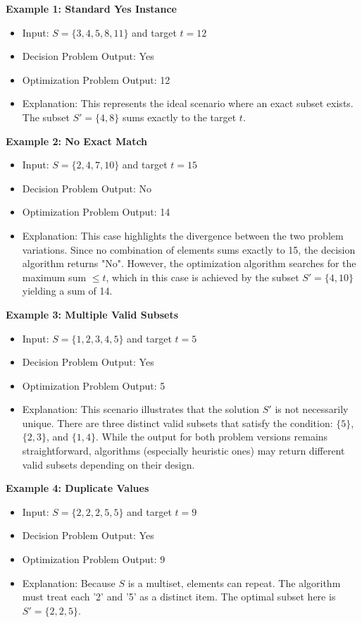 \documentclass[12pt,a4paper]{article}
\begin{document}
\textbf{Example 1: Standard Yes Instance}
\begin{itemize}
\item Input: $S = \{3, 4, 5, 8, 11\}$ and target $t = 12$
\item Decision Problem Output: Yes
\item Optimization Problem Output: 12
\item Explanation: This represents the ideal scenario where an exact subset exists. The subset $S' = \{4, 8\}$ sums exactly to the target $t$.
\end{itemize}

\textbf{Example 2: No Exact Match}
\begin{itemize}
\item Input: $S = \{2, 4, 7, 10\}$ and target $t = 15$
\item Decision Problem Output: No
\item Optimization Problem Output: 14
\item Explanation: This case highlights the divergence between the two problem variations. Since no combination of elements sums exactly to 15, the decision algorithm returns "No". However, the optimization algorithm searches for the maximum sum $\leq t$, which in this case is achieved by the subset $S' = \{4, 10\}$ yielding a sum of 14.
\end{itemize}

\textbf{Example 3: Multiple Valid Subsets}
\begin{itemize}
\item Input: $S = \{1, 2, 3, 4, 5\}$ and target $t = 5$
\item Decision Problem Output: Yes
\item Optimization Problem Output: 5
\item Explanation: This scenario illustrates that the solution $S'$ is not necessarily unique. There are three distinct valid subsets that satisfy the condition: $\{5\}$, $\{2, 3\}$, and $\{1, 4\}$. While the output for both problem versions remains straightforward, algorithms (especially heuristic ones) may return different valid subsets depending on their design.
\end{itemize}

\textbf{Example 4: Duplicate Values}
\begin{itemize}
\item Input: $S = \{2, 2, 2, 5, 5\}$ and target $t = 9$
\item Decision Problem Output: Yes
\item Optimization Problem Output: 9
\item Explanation: Because $S$ is a multiset, elements can repeat. The algorithm must treat each '2' and '5' as a distinct item. The optimal subset here is $S' = \{2, 2, 5\}$.
\end{itemize}
\end{document}
